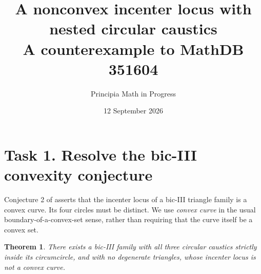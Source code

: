 \documentclass[11pt]{article}
\title{A nonconvex incenter locus with nested circular caustics\\
\large A counterexample to MathDB 351604}
\author{Principia Math in Progress}
\date{12 September 2026}
\newtheorem{theorem}{Theorem}
\begin{document}
\maketitle
\section*{Task 1. Resolve the bic-III convexity conjecture}
Conjecture 2 of \cite[p.~23]{source} asserts that the incenter locus
of a bic-III triangle family is a convex curve. Its four circles must
be distinct. We use \emph{convex curve} in the usual boundary-of-a-convex-set
sense, rather than requiring that the curve itself be a convex set.

\begin{theorem}
There exists a bic-III family with all three circular caustics strictly
inside its circumcircle, and with no degenerate triangles, whose
incenter locus is not a convex curve.
\end{theorem}
\end{document}

